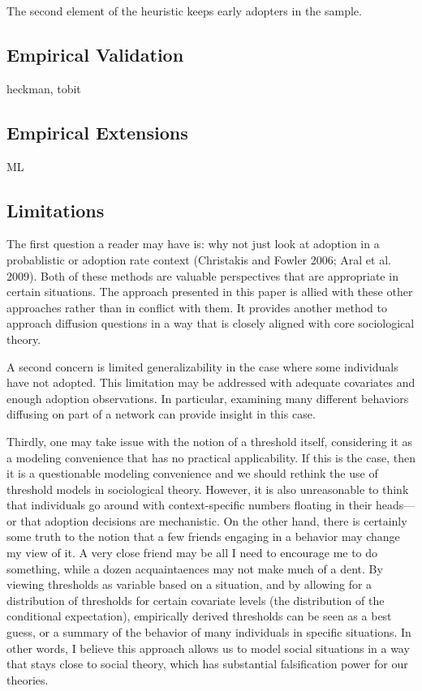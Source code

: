 \documentclass{article}
\begin{document}
The second element of the heuristic keeps early adopters in the sample. 

\subsection{Empirical Validation}

heckman, tobit

\subsection{Empirical Extensions}

ML

\subsection{Limitations}

The first question a reader may have is: why not just look at adoption in a probablistic or adoption rate context (Christakis and Fowler 2006; Aral et al. 2009). Both of these methods are valuable perspectives that are appropriate in certain situations. The approach presented in this paper is allied with these other approaches rather than in conflict with them. It provides another method to approach diffusion questions in a way that is closely aligned with core sociological theory. 

A second concern is limited generalizability in the case where some individuals have not adopted. This limitation may be addressed with adequate covariates and enough adoption observations. In particular, examining many different behaviors diffusing on part of a network can provide insight in this case.

Thirdly, one may take issue with the notion of a threshold itself, considering it as a modeling convenience that has no practical applicability. If this is the case, then it is a questionable modeling convenience and we should rethink the use of threshold models in sociological theory. However, it is also unreasonable to think that individuals go around with context-specific numbers floating in their heads---or that adoption decisions are mechanistic. On the other hand, there is certainly some truth to the notion that a few friends engaging in a behavior may change my view of it. A very close friend may be all I need to encourage me to do something, while a dozen acquaintaences may not make much of a dent. By viewing thresholds as variable based on a situation, and by allowing for a distribution of thresholds for certain covariate levels (the distribution of the conditional expectation), empirically derived thresholds can be seen as a best guess, or a summary of the behavior of many individuals in specific situations. In other words, I believe this approach allows us to model social situations in a way that stays close to social theory, which has substantial falsification power for our theories. 
\end{document}
